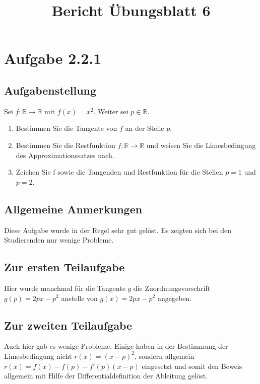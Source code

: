\documentclass[a4paper]{article}
\title{Bericht Übungsblatt 6}
\date{}
\author{}
\newcommand*{\R}{\mathbb R}
\begin{document}
\maketitle

\section{Aufgabe 2.2.1}

\subsection{Aufgabenstellung}

Sei $f:\R\to\R$ mit $f(x)=x^2$. Weiter sei $p\in\R$.

\begin{enumerate}
  \item Bestimmen Sie die Tangente von $f$ an der Stelle $p$.
  \item Bestimmen Sie die Restfunktion $f:\R\to\R$ und weisen Sie die Limesbedingung des Approximationssatzes nach.
  \item Zeichen Sie f sowie die Tangenden und Restfunktion für die Stellen $p=1$ und $p=2$.
\end{enumerate}

\subsection{Allgemeine Anmerkungen}

Diese Aufgabe wurde in der Regel sehr gut gelöst. Es zeigten sich bei den Studierenden nur wenige Probleme.

\subsection{Zur ersten Teilaufgabe}

Hier wurde manchmal für die Tangente $g$ die Zuordnungsvorschrift $g(p)=2px-p^2$ anstelle von $g(x)=2px-p^2$ angegeben.

\subsection{Zur zweiten Teilaufgabe}

Auch hier gab es wenige Probleme. Einige haben in der Bestimmung der Limesbedingung nicht $r(x)=(x-p)^2$, sondern allgemein $r(x)=f(x)-f(p)-f'(p)(x-p)$ eingesetzt und somit den Beweis allgemein mit Hilfe der Differentialdefinition der Ableitung gelöst.
\end{document}
